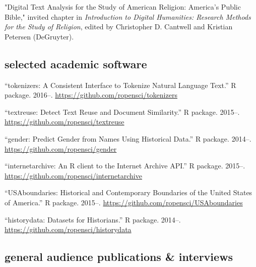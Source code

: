 \documentclass[11pt]{article}
\begin{document}
"Digital Text Analysis for the Study of American Religion: America's Public 
Bible," invited chapter in \emph{Introduction to Digital Humanities: Research 
  Methods for the Study of Religion}, edited by Christopher D. Cantwell and 
Kristian Petersen (DeGruyter).






\subsection{selected academic software}\label{academic-software}

``tokenizers: A Consistent Interface to Tokenize Natural Language Text.'' R 
package. 2016--. \url{https://github.com/ropensci/tokenizers}

``textreuse: Detect Text Reuse and Document Similarity.'' R package. 2015--. 
\url{https://github.com/ropensci/textreuse}

``gender: Predict Gender from Names Using Historical Data.'' R package. 
2014--. \url{https://github.com/ropensci/gender}

``internetarchive: An R client to the Internet Archive API.'' R package.  
2015--. \url{https://github.com/ropensci/internetarchive}

``USAboundaries: Historical and Contemporary Boundaries of the United States 
of America.'' R package.  2015--.  
\url{https://github.com/ropensci/USAboundaries}

``historydata: Datasets for Historians.'' R package. 2014--.  
\url{https://github.com/ropensci/historydata}

\subsection{general audience publications \& interviews}\label{public}
\end{document}
